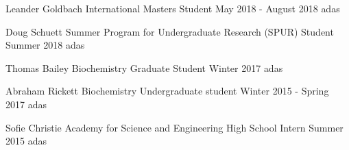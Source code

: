 
\begin{cvmentoring}


  \cvmentor
    {Leander Goldbach} %
    {International Masters Student} %
    {May 2018 - August 2018} %
    {adas}

  \cvmentor
    {Doug Schuett} %
    {Summer Program for Undergraduate Research (SPUR) Student} %
    {Summer 2018} %
    {adas}

  \cvmentor
    {Thomas Bailey} %
    {Biochemistry Graduate Student} %
    {Winter 2017} %
    {adas}

  \cvmentor
    {Abraham Rickett} %
    {Biochemistry Undergraduate student} %
    {Winter 2015 - Spring 2017} %
    {adas}

  \cvmentor
    {Sofie Christie} %
    {Academy for Science and Engineering High School Intern} %
    {Summer 2015} %
    {adas}

\end{cvmentoring}
